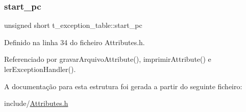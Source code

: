 \mbox{\label{structt__exception__table_a1e301f7924e5e2ebe75dbf5a4bb2b090}} 
\subsubsection{\texorpdfstring{start\+\_\+pc}{start\_pc}}
{\footnotesize\ttfamily unsigned short t\+\_\+exception\+\_\+table\+::start\+\_\+pc}



Definido na linha 34 do ficheiro Attributes.\+h.



Referenciado por gravar\+Arquivo\+Attribute(), imprimir\+Attribute() e ler\+Exception\+Handler().



A documentação para esta estrutura foi gerada a partir do seguinte ficheiro\+:\begin{DoxyCompactItemize}
\item 
include/\hyperlink{Attributes_8h}{Attributes.\+h}\end{DoxyCompactItemize}
